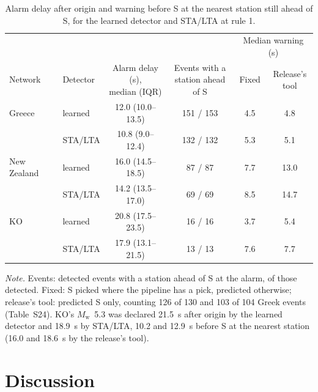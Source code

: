 \documentclass[a4paper,fleqn]{cas-sc}
\newcommand{\Mw}{$M_\mathrm{w}$}
\newcommand{\stalta}{STA/LTA}
\newcommand{\tablenote}[1]{\par\vspace{4pt}%
  \begin{minipage}{\linewidth}\footnotesize\textit{Note.} #1
\end{minipage}}
\begin{document}
\begin{table}[pos=htbp]
  \centering\small
  \caption{Alarm delay after origin and warning before S at the nearest station still
  ahead of S, for the learned detector and \stalta{} at rule 1.}\label{tab:latency}
  \setlength{\tabcolsep}{4pt}
  \begin{tabular}{@{}llcccc@{}}
    \toprule
    & & & & \multicolumn{2}{c}{Median warning (s)} \\
    \cmidrule(lr){5-6}
    Network & Detector & \makecell{Alarm delay (s),\\median (IQR)} & \makecell{Events with a\\station ahead of S} & Fixed & \makecell{Release's\\tool} \\
    \midrule
    Greece & learned & 12.0 (10.0--13.5) & 151 / 153 & 4.5 & 4.8 \\
    & \stalta{} & 10.8 (9.0--12.4) & 132 / 132 & 5.3 & 5.1 \\
    New Zealand & learned & 16.0 (14.5--18.5) & 87 / 87 & 7.7 & 13.0 \\
    & \stalta{} & 14.2 (13.5--17.0) & 69 / 69 & 8.5 & 14.7 \\
    KO & learned & 20.8 (17.5--23.5) & 16 / 16 & 3.7 & 5.4 \\
    & \stalta{} & 17.9 (13.1--21.5) & 13 / 13 & 7.6 & 7.7 \\
    \bottomrule
  \end{tabular}
  \tablenote{Events: detected events with a station ahead of S at the alarm, of those
    detected. Fixed: S picked where the pipeline has a pick, predicted otherwise; release's
    tool: predicted S only, counting 126 of 130 and 103 of 104 Greek events (Table~S24).
    KO's \Mw{}~5.3 was declared 21.5~s after origin by the learned detector and 18.9~s by
    \stalta{}, 10.2 and 12.9~s before S at the nearest station (16.0 and 18.6~s by the
  release's tool).}
\end{table}

\section{Discussion}\label{sec:discussion}
\end{document}
